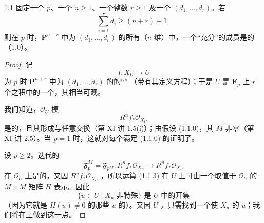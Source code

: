 \begin{SGAresult}{}{1.1}
固定一个 $p$、一个 $n\geq1$、一个整数 $r\geq1$ 及一个 $(d_1,\ldots,d_r)$。若
\[
 \sum_{i=1}^r d_i\geq(n+r)+1,
 \tag{1.1.0}
\]
则在 $p$ 时，$\mathbf P^{n+r}$ 中为 $(d_1,\ldots,d_r)$ 的所有（$n$ 维）中，一个“充分”的成员是的（1.0）。
\end{SGAresult}
\begin{proof}
记
\[
 f:X_U\longrightarrow U
 \tag{1.1.1}
\]
为 $p$ 时 $\mathbf P^{n+r}$ 中为 $(d_1,\ldots,d_r)$ 的的“”
（带有其定义方程）；于是 $U$ 是 $\mathbf F_p$ 上 $r$ 个之积中的一个，其相当可观。

我们知道，$\mathcal O_U$ 模
\[
 R^n f_*\mathcal O_{X_U}
 \tag{1.1.2}
\]
是的，且其形成与任意交换（第 XI 讲 1.5(i)）；由假设 (1.1.0)，其 $M$ 非零（第 XI 讲 2.5）。当 $p=1$ 时，这就对每个满足 (1.1.0) 的证明了。

设 $p\geq2$。迭代的
\[
 \mathfrak F_p^M=\mathfrak F_{p^M}:
 R^n f_*\mathcal O_{X_U}\longrightarrow R^n f_*\mathcal O_{X_U}
 \tag{1.1.3}
\]
在 $\mathcal O_U$ 上是的，又因 $R^n f_*\mathcal O_{X_U}$ ，所以运算 (1.1.3) 在 $U$ 上可由一个取值于 $\mathcal O_U$ 的 $M\times M$ 矩阵 $H$ 表示。因此
\[
 \{u\in U\mid X_u\text{ 非特殊}\}\text{ 是 }U\text{ 中的开集}
 \tag{1.1.4}
\]
（因为它就是 $H(u)\ne0$ 的那些 $u$ 的）。又因 $U$ ，只需找到一个使 $X_u$ 的 $u$；我们将在上做到这一点。
\end{proof}

